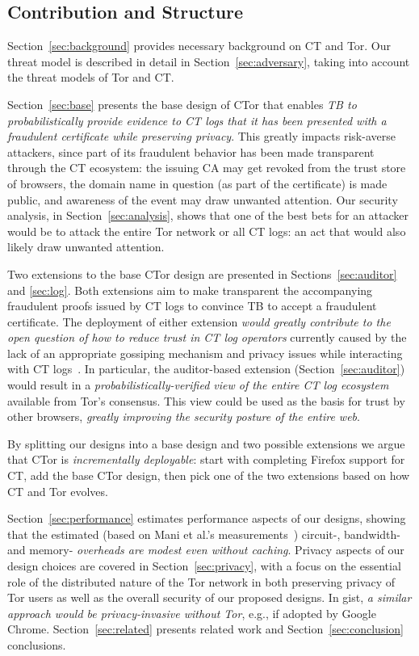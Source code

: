\subsection{Contribution and Structure}
Section~\ref{sec:background} provides necessary background on CT and Tor. Our
threat model is described in detail in Section~\ref{sec:adversary}, taking into
account the threat models of Tor and CT\@.

Section~\ref{sec:base} presents the base design of CTor that enables \emph{TB to
probabilistically provide evidence to CT logs that it has been presented with a
fraudulent certificate while preserving privacy}. This greatly impacts
risk-averse attackers, since part of its fraudulent behavior has been made
transparent through the CT ecosystem: the issuing CA may get revoked from the
trust store of browsers, the domain name in question (as part of the
certificate) is made public, and awareness of the event may draw unwanted
attention. Our security analysis, in Section~\ref{sec:analysis}, shows that one
of the best bets for an attacker would be to attack the entire Tor network or
all CT logs: an act that would also likely draw unwanted attention.

Two extensions to the base CTor design are presented in
Sections~\ref{sec:auditor} and \ref{sec:log}. Both extensions aim to make
transparent the accompanying fraudulent proofs issued by CT logs to convince TB
to accept a fraudulent certificate. The deployment of either extension
\emph{would greatly contribute to the open question of how to reduce trust in CT
log operators} currently caused by the lack of an appropriate gossiping
mechanism and privacy issues while interacting with CT
logs~\cite{minimal-gossip,nordberg,ct-with-privacy}. In particular, the
auditor-based extension (Section~\ref{sec:auditor}) would result in a
\emph{probabilistically-verified view of the entire CT log ecosystem} available
from Tor's consensus. This view could be used as the basis for trust by other
browsers, \emph{greatly improving the security posture of the entire web}.

By splitting our designs into a base design and two possible extensions we argue
that CTor is \emph{incrementally deployable}: start with completing Firefox
support for CT, add the base CTor design, then pick one of the two extensions
based on how CT and Tor evolves.

Section~\ref{sec:performance} estimates performance aspects of our designs,
showing that the estimated (based on Mani et al.'s measurements~\cite{mani})
circuit-, bandwidth- and memory- \emph{overheads are modest even without
caching}. Privacy aspects of our design choices are covered in
Section~\ref{sec:privacy}, with a focus on the essential role of the distributed
nature of the Tor network in both preserving privacy of Tor users as well as the
overall security of our proposed designs. In gist, \emph{a similar approach
would be privacy-invasive without Tor}, e.g., if adopted by Google Chrome.
Section~\ref{sec:related} presents related work and Section~\ref{sec:conclusion}
conclusions.

